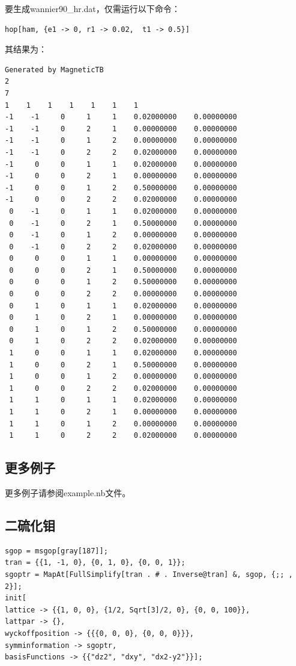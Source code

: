 \documentclass[titlepage,a4paper,12pt,AutoFakeBold]{article}
\begin{document}
要生成wannier90\_hr.dat，仅需运行以下命令：
\begin{lstlisting}[numbers=none]
hop[ham, {e1 -> 0, r1 -> 0.02,  t1 -> 0.5}]
\end{lstlisting}
其结果为：
\begin{lstlisting}[numbers=none]
Generated by MagneticTB
2
7
1    1    1    1    1    1    1
-1    -1     0     1     1    0.02000000    0.00000000
-1    -1     0     2     1    0.00000000    0.00000000
-1    -1     0     1     2    0.00000000    0.00000000
-1    -1     0     2     2    0.02000000    0.00000000
-1     0     0     1     1    0.02000000    0.00000000
-1     0     0     2     1    0.00000000    0.00000000
-1     0     0     1     2    0.50000000    0.00000000
-1     0     0     2     2    0.02000000    0.00000000
 0    -1     0     1     1    0.02000000    0.00000000
 0    -1     0     2     1    0.50000000    0.00000000
 0    -1     0     1     2    0.00000000    0.00000000
 0    -1     0     2     2    0.02000000    0.00000000
 0     0     0     1     1    0.00000000    0.00000000
 0     0     0     2     1    0.50000000    0.00000000
 0     0     0     1     2    0.50000000    0.00000000
 0     0     0     2     2    0.00000000    0.00000000
 0     1     0     1     1    0.02000000    0.00000000
 0     1     0     2     1    0.00000000    0.00000000
 0     1     0     1     2    0.50000000    0.00000000
 0     1     0     2     2    0.02000000    0.00000000
 1     0     0     1     1    0.02000000    0.00000000
 1     0     0     2     1    0.50000000    0.00000000
 1     0     0     1     2    0.00000000    0.00000000
 1     0     0     2     2    0.02000000    0.00000000
 1     1     0     1     1    0.02000000    0.00000000
 1     1     0     2     1    0.00000000    0.00000000
 1     1     0     1     2    0.00000000    0.00000000
 1     1     0     2     2    0.02000000    0.00000000
\end{lstlisting}

\subsection{更多例子}
更多例子请参阅example.nb文件。
\iffalse
\subsection{二硫化钼}

\begin{lstlisting}
sgop = msgop[gray[187]];
tran = {{1, -1, 0}, {0, 1, 0}, {0, 0, 1}};
sgoptr = MapAt[FullSimplify[tran . # . Inverse@tran] &, sgop, {;; , 2}];
init[
lattice -> {{1, 0, 0}, {1/2, Sqrt[3]/2, 0}, {0, 0, 100}},
lattpar -> {},
wyckoffposition -> {{{0, 0, 0}, {0, 0, 0}}},
symminformation -> sgoptr,
basisFunctions -> {{"dz2", "dxy", "dx2-y2"}}];
\end{lstlisting}
\end{document}
